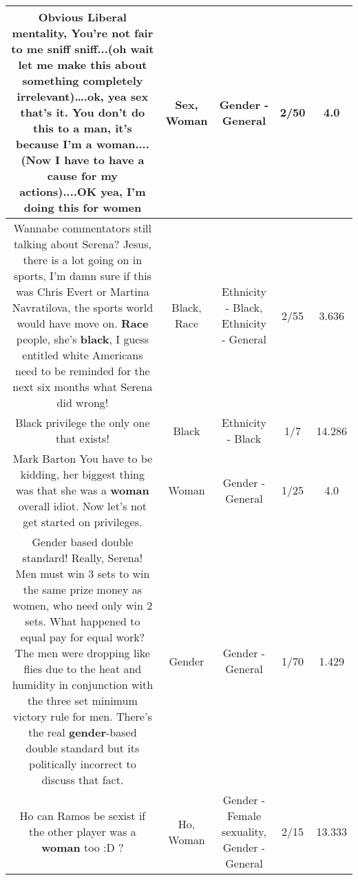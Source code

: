 \documentclass[11pt]{article}
\newlength\mylength
\begin{document}
\begin{center}
\begin{longtable}{|C{.65\mylength}|C{.30\mylength}|C{.12\mylength}|C{.12\mylength}|C{.12\mylength}|}
  \small Obvious Liberal mentality, You're not fair to me sniff sniff...(oh wait let me make this about something completely irrelevant)….ok, yea \textbf{sex} that's it. You don't do this to a man, it's because I'm a \textbf{woman}....(Now I have to have a cause for my actions)....OK yea, I'm doing this for women\normalsize   & Sex, Woman & Gender - General & 2/50 & 4.0 \\  \hline
  \small Wannabe commentators still talking about Serena? Jesus, there is a lot going on in sports, I'm damn sure if this was Chris Evert or Martina Navratilova, the sports world would have move on. \textbf{Race} people, she's \textbf{black}, I guess entitled white Americans need to be reminded for the next six months what Serena did wrong!\normalsize   & Black, Race & Ethnicity - Black, Ethnicity - General & 2/55 & 3.636 \\  \hline
  \small Black privilege the only one that exists!\normalsize   & Black & Ethnicity - Black & 1/7 & 14.286 \\  \hline
  \small Mark Barton  You have to be kidding, her biggest thing was that she was a \textbf{woman} overall idiot.  Now let's not get started on privileges.\normalsize   & Woman & Gender - General & 1/25 & 4.0 \\  \hline
  \small Gender based double standard!  Really, Serena!  Men must win 3 sets to win the same prize money as women, who need only win 2 sets.  What happened to equal pay for equal work?  The men were dropping like flies due to the heat and humidity in conjunction with the three set minimum victory rule for men.  There's the real \textbf{gender}-based double standard but its politically incorrect to discuss that fact.\normalsize   & Gender & Gender - General & 1/70 & 1.429 \\  \hline
  \small Ho can Ramos be sexist if the other player was a \textbf{woman} too :D ?\normalsize   & Ho, Woman & Gender - Female sexuality, Gender - General & 2/15 & 13.333 \\  \hline

\end{longtable}
\end{center}
\end{document}
